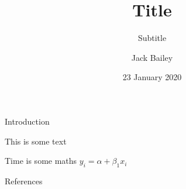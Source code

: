 \documentclass[
  ignorenonframetext,
]{beamer}
\title{Title}
\subtitle{Subtitle}
\author{Jack Bailey}
\date{23 January 2020}
\begin{document}
\frame{\titlepage}

\begin{frame}{Introduction}
\protect\hypertarget{introduction}{}

This is some text

Time is some maths \(y_{i} = \alpha + \beta_{1}x_{i}\)

\end{frame}

\begin{frame}{References}
\protect\hypertarget{references}{}

\hypertarget{refs}{}

\end{frame}
\end{document}

